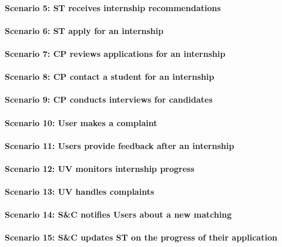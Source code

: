 \paragraph{Scenario 5: ST receives internship recommendations }

\paragraph{Scenario 6: ST apply for an internship }

\paragraph{Scenario 7: CP reviews applications for an internship }

\paragraph{Scenario 8: CP contact a student for an internship }
\paragraph{Scenario 9: CP conducts interviews for candidates }
\paragraph{Scenario 10: User makes a complaint }
\paragraph{Scenario 11: Users provide feedback after an internship}
\paragraph{Scenario 12: UV monitors internship progress}
\paragraph{Scenario 13: UV handles complaints}
\paragraph{Scenario 14: S\&C notifies Users about a new matching}
\paragraph{Scenario 15: S\&C updates ST on the progress of their application}

\newpage

